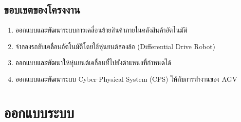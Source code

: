 \documentclass{classes/fiboreport}
\begin{document}
\section{ขอบเขตของโครงงาน}
\begin{enumerate}[label=\thesection.\arabic*, leftmargin=1.5cm]
	\setlength\itemsep{-0.25em}
	\item ออกแบบและพัฒนาระบบการเคลื่อนย้ายสินค้าภายในคลังสินค้าอัตโนมัติ
	\item จำลองรถขับเคลื่อนอัตโนมัติโดยใช้หุ่นยนต์สองล้อ (Differential Drive Robot)
	\item ออกแบบและพัฒนาให้หุ่นยนต์เคลื่อนที่ไปยังตำแหน่งที่กำหนดได้
	\item ออกแบบและพัฒนาระบบ Cyber-Physical System (CPS) ให้กับการทำงานของ AGV
\end{enumerate}



\chapter{ออกแบบระบบ}
\end{document}
